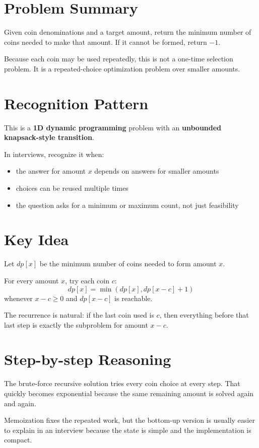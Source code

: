 \section{Problem Summary}
Given coin denominations and a target amount, return the minimum number of coins needed to make that amount. If it cannot be formed, return \(-1\).

Because each coin may be used repeatedly, this is not a one-time selection problem. It is a repeated-choice optimization problem over smaller amounts.

\section{Recognition Pattern}
This is a \textbf{1D dynamic programming} problem with an \textbf{unbounded knapsack-style transition}.

In interviews, recognize it when:
\begin{itemize}
\item the answer for amount \(x\) depends on answers for smaller amounts
\item choices can be reused multiple times
\item the question asks for a minimum or maximum count, not just feasibility
\end{itemize}

\section{Key Idea}
Let \(dp[x]\) be the minimum number of coins needed to form amount \(x\).

For every amount \(x\), try each coin \(c\):
\[
dp[x] = \min(dp[x], dp[x - c] + 1)
\]
whenever \(x - c \ge 0\) and \(dp[x - c]\) is reachable.

The recurrence is natural: if the last coin used is \(c\), then everything before that last step is exactly the subproblem for amount \(x - c\).

\section{Step-by-step Reasoning}
The brute-force recursive solution tries every coin choice at every step. That quickly becomes exponential because the same remaining amount is solved again and again.

Memoization fixes the repeated work, but the bottom-up version is usually easier to explain in an interview because the state is simple and the implementation is compact.


